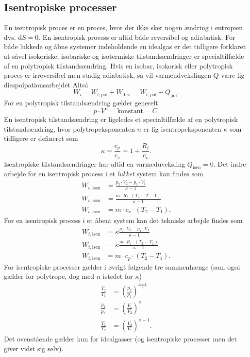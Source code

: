 \subsection{Isentropiske processer}
En isentropisk proces er en proces, hvor der ikke sker nogen ændring i entropien dvs. $\mathrm{d}S = 0$. En isentropisk process er altid både reversibel og adiabatisk. For både lukkede og åbne systemer indeholdende en idealgas er det tidligere forklaret at såvel isokoriske, isobariske og isotermiske tilstandsændringer er specialtilfælde af en polytropisk tilstandsændring. Hvis en isobar, isokorisk eller polytropisk proces er irreversibel men stadig adiabatisk, så vil varmeudvekslingen $Q$ være lig disspoípationsarbejdet Altså
\[ 
W_i = W_{t, \mathrm{pol}} + W_{\mathrm{diss}} = W_{t, \mathrm{pol}} + Q_{\mathrm{pol}}
.\]
For en polytropisk tilstandsændring gælder generelt
\[ 
p \cdot V^{n} = \mathrm{konstant} = C
.\]
En isentropisk tilstandsændring er ligeledes et specialtilfælde af en polytropisk tilstandsændring, hvor polytropeksponenten $n$ er lig isentropeksponenten $\kappa$ som tidligere er defineret som
\[ 
\kappa = \frac{c_p}{c_v} = 1 + \frac{R_i}{c_v}
.\]
Isentropiske tilstandsændringer har altid en varmeduveksling $Q_{\mathrm{isen}} = 0$. Det indre arbejde for en isentropisk process i et \textit{lukket} system kan findes som
\begin{align*}
  W_{v, \mathrm{isen}} &= \frac{p_2 \cdot V_2 - p_1 \cdot V_1}{\kappa-1} \\
  W_{v, \mathrm{isen}} &= \frac{m \cdot R_i \cdot \left( T_2 - T-1 \right)}{\kappa-1} \\
  W_{v, \mathrm{isen}} &= m \cdot c_v \cdot \left( T_2 - T_1 \right)
.\end{align*}
For en isentropisk process i et åbent system kan det tekniske arbejde findes som
\begin{align*}
  W_{t, \mathrm{isen}} &= \kappa \frac{p_2 \cdot V_2 - p_1 \cdot V_1}{\kappa-1} \\
  W_{t, \mathrm{isen}} &= \kappa \frac{m \cdot R_i \cdot \left( T_2 - T_1 \right)}{\kappa-1} \\
  W_{t, \mathrm{isen}} &= m \cdot c_p \cdot \left( T_2 - T_1 \right)
.\end{align*}
For isentropiske processer gælder i øvrigt følgende tre sammenhænge (som også gælder for polytrope, dog med $n$ istedet for $\kappa$)
\begin{align*}
  \frac{T_2}{T_1} &= \left( \frac{p_2}{p_1} \right)^{\frac{\kappa - 1}{\kappa}} \\
  \frac{p_2}{p_1} &= \left( \frac{V_1}{V_2} \right)^{\kappa} \\
  \frac{T_1}{T_2} &= \left( \frac{V_2}{V_1} \right)^{\kappa-1}
.\end{align*}
Det ovenstående gælder kun for idealgasser (og isentropiske processer men det giver vidst sig selv).

